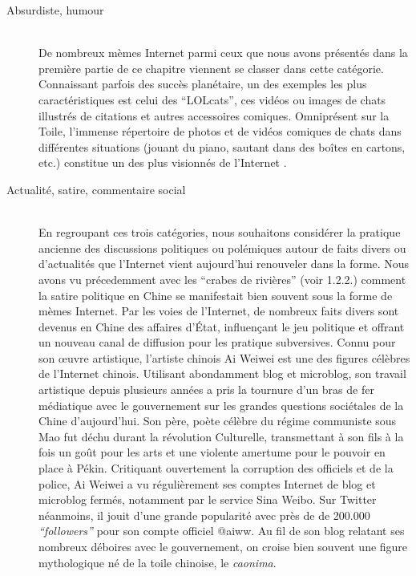 \begin{description}

\item[Absurdiste, humour]
\hfill \\
De nombreux m\`emes Internet parmi ceux que nous avons pr\'esent\'es dans la premi\`ere partie de ce chapitre viennent se classer dans cette cat\'egorie. Connaissant parfois des succ\`es plan\'etaire, un des exemples les plus caract\'eristiques est celui des {\textquotedblleft}LOLcats{\textquotedblright}, ces vid\'eos ou images de chats illustr\'es de citations et autres accessoires comiques. Omnipr\'esent sur la Toile, l{\textquoteright}immense r\'epertoire de photos et de vid\'eos comiques de chats dans diff\'erentes situations (jouant du piano, sautant dans des bo\^ites en cartons, etc.) constitue un des plus visionn\'es de l{\textquoteright}Internet \cite{Bauckage2011}. 

\item[Actualit\'e, satire, commentaire social]
\hfill \\
En regroupant ces trois cat\'egories, nous souhaitons consid\'erer la pratique ancienne des discussions politiques ou pol\'emiques autour de faits divers ou d{\textquoteright}actualit\'es que l{\textquoteright}Internet vient aujourd{\textquoteright}hui renouveler dans la forme. Nous avons vu pr\'ecedemment avec les {\textquotedblleft}crabes de rivi\`eres{\textquotedblright} (voir 1.2.2.) \textcolor[rgb]{0.0,0.0,0.039215688}{comment la satire politique en Chine se manifestait bien souvent sous la forme de m\`emes Internet. Par les voies de l{\textquoteright}Internet, }de nombreux faits divers sont devenus en Chine des affaires d{\textquoteright}\'Etat, influen\c{c}ant le jeu politique et offrant un nouveau canal de diffusion pour les pratique subversives. Connu pour son {\oe}uvre artistique, l{\textquoteright}artiste chinois Ai Weiwei est une des figures c\'el\`ebres de l{\textquoteright}Internet chinois. Utilisant abondamment blog et microblog, son travail artistique depuis plusieurs ann\'ees a pris la tournure d{\textquoteright}un bras de fer m\'ediatique avec le gouvernement sur les grandes questions soci\'etales de la Chine d{\textquoteright}aujourd{\textquoteright}hui. Son p\`ere, po\`ete c\'el\`ebre du r\'egime communiste sous Mao fut d\'echu durant la r\'evolution Culturelle, transmettant \`a son fils \`a la fois un go\^ut pour les arts et une violente amertume pour le pouvoir en place \`a P\'ekin. Critiquant ouvertement la corruption des officiels et de la police, Ai Weiwei a vu r\'eguli\`erement ses comptes Internet de blog et microblog ferm\'es, notamment par le service Sina Weibo. Sur Twitter n\'eanmoins, il jouit d{\textquoteright}une grande popularit\'e avec pr\`es de de 200.000 \textit{{\textquotedblleft}followers{\textquotedblright}} pour son compte officiel @aiww. Au fil de son blog relatant ses nombreux d\'eboires avec le gouvernement, on croise bien souvent une figure mythologique n\'e de la toile chinoise, le \textit{caonima}.  


\end{description}
